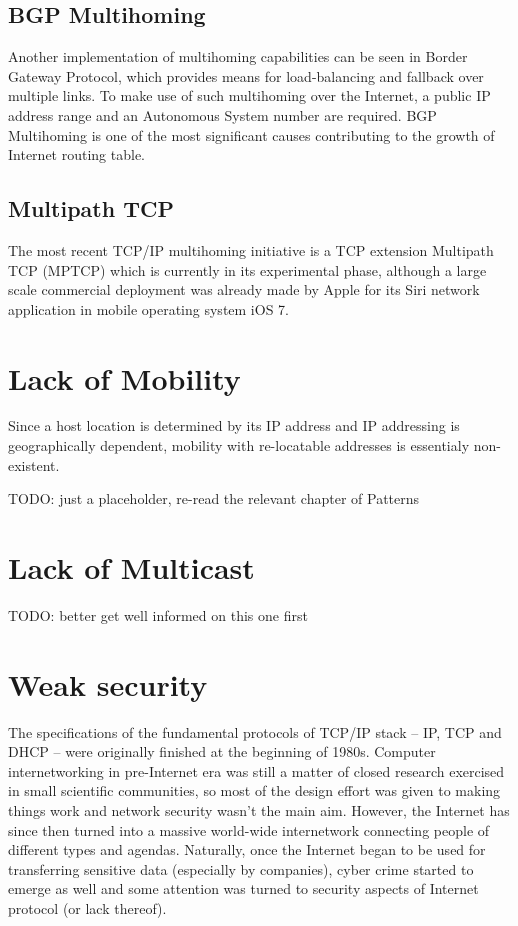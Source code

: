         \subsection{BGP Multihoming}
        Another implementation of multihoming capabilities can be seen in Border Gateway Protocol, which provides means for load-balancing and fallback over multiple links. To make use of such multihoming over the Internet, a public IP address range and an Autonomous System number are required. BGP Multihoming is one of the most significant causes contributing to the growth of Internet routing table.

        \subsection{Multipath TCP}
        The most recent TCP/IP multihoming initiative is a TCP extension Multipath TCP (MPTCP) which is currently in its experimental phase, although a large scale commercial deployment was already made by Apple for its Siri network application in mobile operating system iOS 7.

    \section{Lack of Mobility}

        Since a host location is determined by its IP address and IP addressing is geographically dependent, mobility with re-locatable addresses is essentialy non-existent.

        TODO: just a placeholder, re-read the relevant chapter of Patterns

    \section{Lack of Multicast}

        TODO: better get well informed on this one first

    \section{Weak security}
        The specifications of the fundamental protocols of TCP/IP stack -- IP, TCP and DHCP -- were originally finished at the beginning of 1980s. Computer internetworking in pre-Internet era was still a matter of closed research exercised in small scientific communities, so most of the design effort was given to making things work and network security wasn't the main aim. However, the Internet has since then turned into a massive world-wide internetwork connecting people of different types and agendas. Naturally, once the Internet began to be used for transferring sensitive data (especially by companies), cyber crime started to emerge as well and some attention was turned to security aspects of Internet protocol (or lack thereof).

